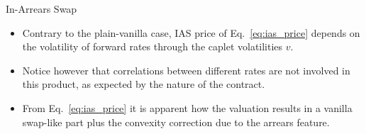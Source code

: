 \documentclass{beamer}
\begin{document}
\begin{frame}{In-Arrears Swap}
\begin{itemize}
\item Contrary to the plain-vanilla case, IAS price of Eq.~\ref{eq:ias_price} depends on the volatility of forward rates through the caplet volatilities $v$. 
\item Notice however that correlations between different rates are not involved in this product, as expected by the nature of the contract.
\item  From Eq.~\ref{eq:ias_price} it is apparent how the valuation results in a vanilla swap-like part plus the convexity correction due to the arrears feature.

\end{itemize}
\end{frame}
\end{document}

